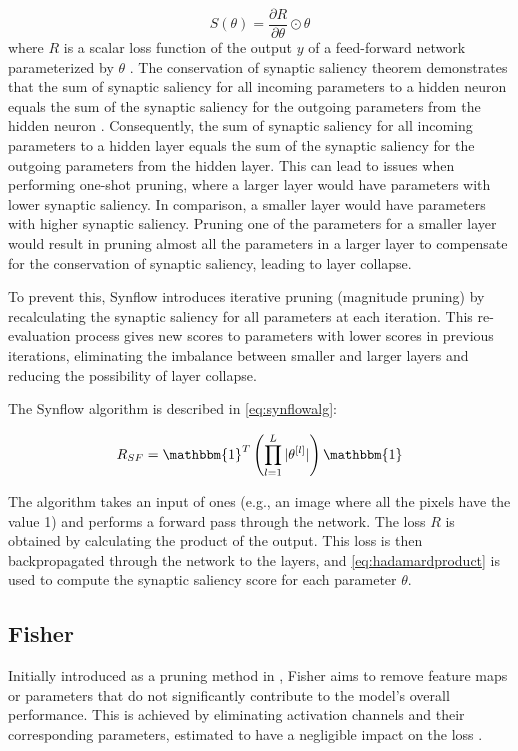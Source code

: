 \begin{equation}
S(\theta) = \frac{\partial R}{\partial \theta} \odot \theta
\label{eq:hadamardproduct}
\end{equation}
where $R$ is a scalar loss function of the output $y$ of a feed-forward network parameterized by $\theta$ \autocite{tanaka2020pruning}. The conservation of synaptic saliency theorem demonstrates that the sum of synaptic saliency for all incoming parameters to a hidden neuron equals the sum of the synaptic saliency for the outgoing parameters from the hidden neuron \autocite{tanaka2020pruning}. Consequently, the sum of synaptic saliency for all incoming parameters to a hidden layer equals the sum of the synaptic saliency for the outgoing parameters from the hidden layer. This can lead to issues when performing one-shot pruning, where a larger layer would have parameters with lower synaptic saliency. In comparison, a smaller layer would have parameters with higher synaptic saliency. Pruning one of the parameters for a smaller layer would result in pruning almost all the parameters in a larger layer to compensate for the conservation of synaptic saliency, leading to layer collapse.

\noindent To prevent this, Synflow introduces iterative pruning (magnitude pruning) by recalculating the synaptic saliency for all parameters at each iteration. This re-evaluation process gives new scores to parameters with lower scores in previous iterations, eliminating the imbalance between smaller and larger layers and reducing the possibility of layer collapse.

\noindent The Synflow algorithm is described in \cref{eq:synflowalg}:

\begin{equation}\label{eq:synflowalg}
R_{SF} = \mathbbm{1}^T \left( \prod^L_{l=1} |\theta^{[l]}| \right) \mathbbm{1}
\end{equation}

The algorithm takes an input of ones (e.g., an image where all the pixels have the value 1) and performs a forward pass through the network. The loss $R$ is obtained by calculating the product of the output. This loss is then backpropagated through the network to the layers, and \cref{eq:hadamardproduct} is used to compute the synaptic saliency score for each parameter $\theta$.

\subsection{Fisher}
Initially introduced as a pruning method in \autocite{DBLP:journals/corr/abs-1801-05787}, Fisher aims to remove feature maps or parameters that do not significantly contribute to the model's overall performance. This is achieved by eliminating activation channels and their corresponding parameters, estimated to have a negligible impact on the loss \autocite{abdelfattah2021zero}.

